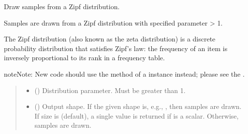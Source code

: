 \documentclass[letterpaper,10pt,english]{sphinxmanual}
\begin{document}
\begin{fulllineitems}
\label{\detokenize{metilda.controllers:metilda.controllers.pitch_art_wizard.zipf}}
\pysigstartsignatures
{}
\pysigstopsignatures
\sphinxAtStartPar
Draw samples from a Zipf distribution.

\sphinxAtStartPar
Samples are drawn from a Zipf distribution with specified parameter
 \textgreater{} 1.

\sphinxAtStartPar
The Zipf distribution (also known as the zeta distribution) is a
discrete probability distribution that satisfies Zipf’s law: the
frequency of an item is inversely proportional to its rank in a
frequency table.

\begin{sphinxadmonition}{note}{Note:}
\sphinxAtStartPar
New code should use the 
method of a  instance instead;
please see the .
\end{sphinxadmonition}
\begin{quote}\begin{description}
\begin{itemize}
\item {} 
\sphinxAtStartPar
{} () \textendash{} Distribution parameter. Must be greater than 1.

\item {} 
\sphinxAtStartPar
{} (\sphinxstyleliteralemphasis{\sphinxupquote{, }}) \textendash{} Output shape.  If the given shape is, e.g., , then
 samples are drawn.  If size is  (default),
a single value is returned if  is a scalar. Otherwise,
 samples are drawn.


\end{itemize}
\end{description}
\end{quote}
\end{fulllineitems}
\end{document}
